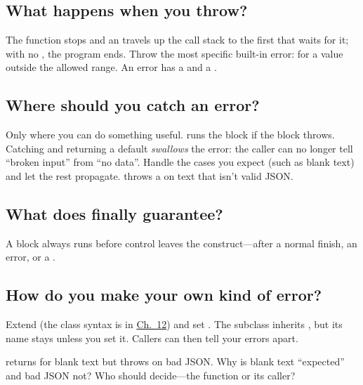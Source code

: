 \label{ch:c10}

\subsection{What happens when you throw?}%
The function stops and an  travels up the call stack to the first  that waits for it; with no , the program ends. Throw the most specific built-in error:  for a value outside the allowed range. An error has a  and a .

\subsection{Where should you catch an error?}%
Only where you can do something useful.  runs the  block if the  block throws. Catching and returning a default \emph{swallows} the error: the caller can no longer tell ``broken input'' from ``no data''. Handle the cases you expect (such as blank text) and let the rest propagate.  throws a  on text that isn't valid JSON.

\subsection{What does finally guarantee?}%
A  block always runs before control leaves the  construct---after a normal finish, an error, or a .

\subsection{How do you make your own kind of error?}%
Extend  (the class syntax is in \hyperref[ch:c12]{Ch.~12}) and set . The subclass inherits , but its name stays  unless you set it. Callers can then tell your errors apart.

\begin{ponder} returns \code{\{\}} for blank text but throws on bad JSON. Why is blank text ``expected'' and bad JSON not? Who should decide---the function or its caller?\end{ponder}
